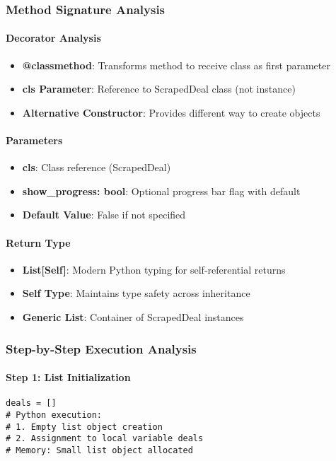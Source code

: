 \subsubsection{Method Signature Analysis}

\paragraph{Decorator Analysis}
\begin{itemize}
\item \textbf{@classmethod}: Transforms method to receive class as first parameter
\item \textbf{cls Parameter}: Reference to ScrapedDeal class (not instance)
\item \textbf{Alternative Constructor}: Provides different way to create objects
\end{itemize}

\paragraph{Parameters}
\begin{itemize}
\item \textbf{cls}: Class reference (ScrapedDeal)
\item \textbf{show\_progress: bool}: Optional progress bar flag with default
\item \textbf{Default Value}: False if not specified
\end{itemize}

\paragraph{Return Type}
\begin{itemize}
\item \textbf{List[Self]}: Modern Python typing for self-referential returns
\item \textbf{Self Type}: Maintains type safety across inheritance
\item \textbf{Generic List}: Container of ScrapedDeal instances
\end{itemize}

\subsubsection{Step-by-Step Execution Analysis}

\paragraph{Step 1: List Initialization}
\begin{lstlisting}[caption=Container Initialization]
deals = []
# Python execution:
# 1. Empty list object creation
# 2. Assignment to local variable deals
# Memory: Small list object allocated
\end{lstlisting}

